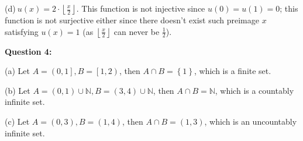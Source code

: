 \documentclass[a4paper,12pt]{article}
\begin{document}
\begin{spacing}{1.4}
    (d)$\ \displaystyle u(x)=2\cdot \left\lfloor \frac{x}{2} \right\rfloor$.
    This function is not injective since $u(0)=u(1)=0$;
    this function is not surjective either since there doesn't exist
    such preimage $x$ satisfying $u(x)=1$
    (as $\left\lfloor \frac{x}{2} \right\rfloor$ can never be $\frac{1}{2}$).

    \vspace{30px}

    \textbf{Question 4:}

    (a) Let $A=\left( 0,1\right], B=\left[ 1,2\right)$,
    then $A\cap B=\left\{ 1 \right\}$, which is a finite set.

    (b) Let $A=(0,1)\cup \mathbb{N}, B=(3,4)\cup \mathbb{N}$,
    then $A\cap B=\mathbb{N}$, which is a countably infinite set.

    (c) Let $A=(0,3), B=(1,4)$, then $A\cap B =(1,3)$,
    which is an uncountably infinite set.



    

    \end{spacing}
\end{document}
